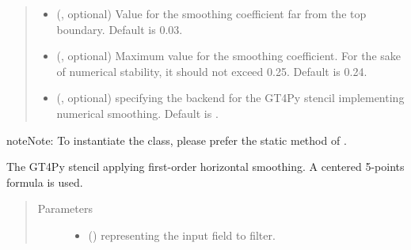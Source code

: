 \documentclass[letterpaper,10pt,english]{sphinxmanual}
\begin{document}
\begin{fulllineitems}
\begin{fulllineitems}
\begin{quote}
\begin{description}
\begin{itemize}
\item {} 
 (, optional) \textendash{} Value for the smoothing coefficient far from the top boundary. Default is 0.03.

\item {} 
 (, optional) \textendash{} Maximum value for the smoothing coefficient. For the sake of numerical stability, it should not
exceed 0.25. Default is 0.24.

\item {} 
 (, optional) \textendash{}  specifying the backend for the GT4Py stencil implementing numerical
smoothing. Default is .

\end{itemize}

\end{description}\end{quote}

\begin{sphinxadmonition}{note}{Note:}
To instantiate the class, please prefer the static method 
of {\hyperref[\detokenize{api:dycore.horizontal_smoothing.HorizontalSmoothing}]{}}.
\end{sphinxadmonition}

\end{fulllineitems}


\begin{fulllineitems}
\label{\detokenize{api:dycore.horizontal_smoothing.HorizontalSmoothingFirstOrderXYZ._stencil_defs}}
The GT4Py stencil applying first-order horizontal smoothing. A centered 5-points formula is used.
\begin{quote}\begin{description}
\item[{Parameters}] \leavevmode\begin{itemize}
\item {} 
 () \textendash{}  representing the input field to filter.


\end{itemize}
\end{description}
\end{quote}
\end{fulllineitems}
\end{fulllineitems}
\end{document}
